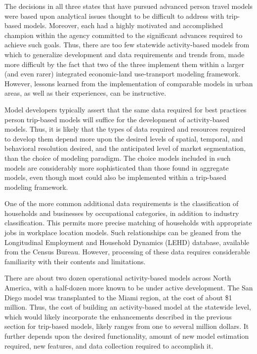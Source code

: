 The decisions in all three states that have pursued advanced person travel models were based upon analytical issues thought to be difficult to address with trip-based models. Moreover, each had a highly motivated and accomplished champion within the agency committed to the significant advances required to achieve such goals. Thus, there are too few statewide activity-based models from which to generalize development and data requirements and trends from, made more difficult by the fact that two of the three implement them within a larger (and even rarer) integrated economic-land use-transport modeling framework. However, lessons learned from the implementation of comparable models in urban areas, as well as their experiences, can be instructive.

Model developers typically assert that the same data required for best practices person trip-based models will suffice for the development of activity-based models. Thus, it is likely that the types of data required and resources required to develop them depend more upon the desired levels of spatial, temporal, and behavioral resolution desired, and the anticipated level of market segmentation, than the choice of modeling paradigm. The choice models included in such models are considerably more sophisticated than those found in aggregate models, even though most could also be implemented within a trip-based modeling framework.

One of the more common additional data requirements is the classification of households and businesses by occupational categories, in addition to industry classification. This permits more precise matching of households with appropriate jobs in workplace location models. Such relationships can be gleaned from the Longitudinal Employment and Household Dynamics (LEHD) database, available from the Census Bureau. However, processing of these data requires considerable familiarity with their contents and limitations.

There are about two dozen operational activity-based models across North America, with a half-dozen more known to be under active development. The San Diego model was transplanted to the Miami region, at the cost of about \$1 million. Thus, the cost of building an activity-based model at the statewide level, which would likely incorporate the enhancements described in the previous section for trip-based models, likely ranges from one to several million dollars. It further depends upon the desired functionality, amount of new model estimation required, new features, and data collection required to accomplish it.

